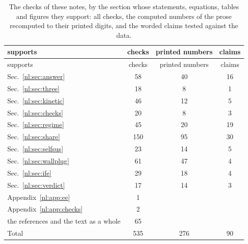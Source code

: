 {\small
\begin{longtable}{L{6.4cm}ccc}
\caption{The checks of these notes, by the section whose statements, equations, tables and figures they support: all checks, the computed numbers of the prose recomputed to their printed digits, and the worded claims tested against the data.}\label{nl:tab:checks}\\
\toprule
supports & checks & printed numbers & claims\\
\midrule
\endfirsthead
\toprule
supports & checks & printed numbers & claims\\
\midrule
\endhead
\bottomrule
\endfoot
Sec.~\ref*{nl:sec:answer} & 58 & 40 & 16\\
Sec.~\ref*{nl:sec:three} & 18 & 8 & 1\\
Sec.~\ref*{nl:sec:kinetic} & 46 & 12 & 5\\
Sec.~\ref*{nl:sec:checks} & 20 & 8 & 3\\
Sec.~\ref*{nl:sec:regime} & 45 & 20 & 19\\
Sec.~\ref*{nl:sec:share} & 150 & 95 & 30\\
Sec.~\ref*{nl:sec:selfsus} & 23 & 14 & 5\\
Sec.~\ref*{nl:sec:wallplug} & 61 & 47 & 4\\
Sec.~\ref*{nl:sec:ife} & 29 & 18 & 4\\
Sec.~\ref*{nl:sec:verdict} & 17 & 14 & 3\\
Appendix~\ref*{nl:app:ee} & 1 &  & \\
Appendix~\ref*{nl:app:checks} & 2 &  & \\
the references and the text as a whole & 65 &  & \\
\midrule
Total & 535 & 276 & 90\\
\end{longtable}
}
